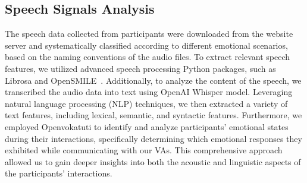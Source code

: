 \subsection{Speech Signals Analysis}
The speech data collected from participants were downloaded from the website server and systematically classified according to different emotional scenarios, based on the naming conventions of the audio files. To extract relevant speech features, we utilized advanced speech processing Python packages, such as Librosa and OpenSMILE~\cite{eyben2010opensmile}. Additionally, to analyze the content of the speech, we transcribed the audio data into text using OpenAI Whisper model. Leveraging natural language processing (NLP) techniques, we then extracted a variety of text features, including lexical, semantic, and syntactic features. Furthermore, we employed Openvokatuti to identify and analyze participants' emotional states during their interactions, specifically determining which emotional responses they exhibited while communicating with our VAs. This comprehensive approach allowed us to gain deeper insights into both the acoustic and linguistic aspects of the participants' interactions.



